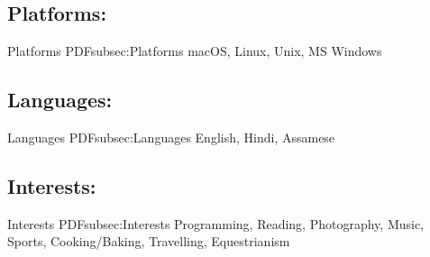 \documentclass[a4paper,10pt,oneside]{article}
\begin{document}
\begin{body}
\subsection
{Platforms:}
{Platforms}
{PDFsubsec:Platforms}
macOS, Linux, Unix, MS Windows
\vspace{15pt}
\subsection
{Languages:}
{Languages}
{PDFsubsec:Languages}
English, Hindi, Assamese
\vspace{15pt}
\subsection
{Interests:}
{Interests}
{PDFsubsec:Interests}
Programming, Reading, Photography, Music, Sports, Cooking/Baking, Travelling, Equestrianism

\vspace{-5pt}
\hline




%
%


\end{body}
\end{document}
